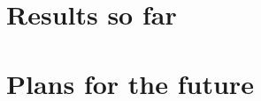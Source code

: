 \documentclass[11pt,a4paper]{article}
\begin{document}
\section{Results so far}
\label{sec:Results so far}

\section{Plans for the future}
\label{sec:Plans for the future}



\renewcommand\refname{Bibliography}
\printbibliography[
heading=bibintoc,
title={Bibliography}
]
\end{document}
